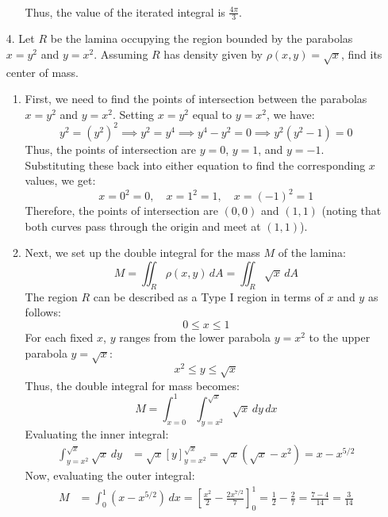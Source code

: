 \documentclass[reqno, 12pt]{amsart}
\begin{document}
\begin{itemize}
\begin{answerbox}
\begin{enumerate}
\begin{align*}
          \end{align*}
          Thus, the value of the iterated integral is $\boxed{\frac{4\pi}{3}}$.
      \end{enumerate}
    \end{answerbox}
    \vspace{0.5 in}
    \newpage
  \item[4.] Let $R$ be the lamina occupying the region bounded by the parabolas $x=y^2$ and $y = x^2$. Assuming $R$ has density given by $\rho(x,y) = \sqrt{x}$, find its center of mass.
    \newline

    \begin{answerbox}
      \begin{enumerate}
        \item First, we need to find the points of intersection between the parabolas $x = y^2$ and $y = x^2$. Setting $x = y^2$ equal to $y = x^2$, we have:
          \[y^2 = (y^2)^2 \implies y^2 = y^4 \implies y^4 - y^2 = 0 \implies y^2(y^2 - 1) = 0\]
          Thus, the points of intersection are $y = 0$, $y = 1$, and $y = -1$. Substituting these back into either equation to find the corresponding $x$ values, we get:
          \[x = 0^2 = 0, \quad x = 1^2 = 1, \quad x = (-1)^2 = 1\]
          Therefore, the points of intersection are $(0,0)$ and $(1,1)$ (noting that both curves pass through the origin and meet at $(1,1)$).
        \item Next, we set up the double integral for the mass $M$ of the lamina:
          \[M = \iint_R \rho(x,y) \, dA = \iint_R \sqrt{x} \, dA\]
          The region $R$ can be described as a Type I region in terms of $x$ and $y$ as follows:
          \[0 \leq x \leq 1\]
          For each fixed $x$, $y$ ranges from the lower parabola $y = x^2$ to the upper parabola $y = \sqrt{x}$:
          \[x^2 \leq y \leq \sqrt{x}\]
          Thus, the double integral for mass becomes:
          \[M = \int_{x=0}^{1} \int_{y=x^2}^{\sqrt{x}} \sqrt{x} \, dy \, dx\]
          Evaluating the inner integral:
          \begin{align*}
            \int_{y=x^2}^{\sqrt{x}} \sqrt{x} \, dy &= \sqrt{x} [y]_{y=x^2}^{\sqrt{x}} = \sqrt{x} (\sqrt{x} - x^2) = x - x^{5/2}
          \end{align*}
          Now, evaluating the outer integral:
          \begin{align*}
            M &= \int_{0}^{1} (x - x^{5/2}) \, dx = \left[ \frac{x^2}{2} - \frac{2x^{7/2}}{7} \right]_{0}^{1} = \frac{1}{2} - \frac{2}{7} = \frac{7-4}{14} = \frac{3}{14}

\end{align*}
\end{enumerate}
\end{answerbox}
\end{itemize}
\end{document}
